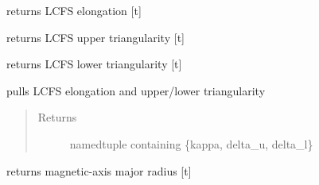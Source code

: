 \documentclass[letterpaper,10pt,english]{sphinxmanual}
\begin{document}
\begin{fulllineitems}

\begin{fulllineitems}
\label{eqtools:eqtools.EFIT.EFITTree.getElongation}
returns LCFS elongation {[}t{]}

\end{fulllineitems}


\begin{fulllineitems}
\label{eqtools:eqtools.EFIT.EFITTree.getUpperTriangularity}
returns LCFS upper triangularity {[}t{]}

\end{fulllineitems}


\begin{fulllineitems}
\label{eqtools:eqtools.EFIT.EFITTree.getLowerTriangularity}
returns LCFS lower triangularity {[}t{]}

\end{fulllineitems}


\begin{fulllineitems}
\label{eqtools:eqtools.EFIT.EFITTree.getShaping}
pulls LCFS elongation and upper/lower triangularity
\begin{quote}\begin{description}
\item[{Returns}] \leavevmode
namedtuple containing \{kappa, delta\_u, delta\_l\}

\end{description}\end{quote}

\end{fulllineitems}


\begin{fulllineitems}
\label{eqtools:eqtools.EFIT.EFITTree.getMagR}
returns magnetic-axis major radius {[}t{]}


\end{fulllineitems}
\end{fulllineitems}
\end{document}
